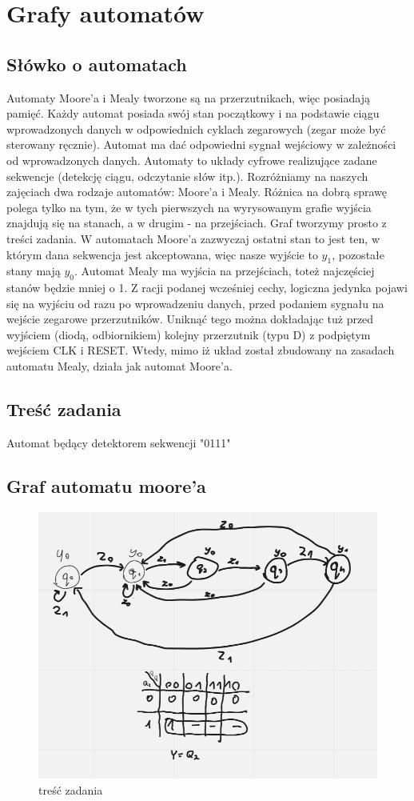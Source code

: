 \section{Grafy automatów}

\subsection{Słówko o automatach}

Automaty Moore'a i Mealy tworzone są na przerzutnikach, więc posiadają pamięć. Każdy automat posiada swój stan początkowy i na podstawie ciągu wprowadzonych danych w odpowiednich cyklach zegarowych (zegar może być sterowany ręcznie). Automat ma dać odpowiedni sygnał wejściowy w zależności od wprowadzonych danych. Automaty to układy cyfrowe realizujące zadane sekwencje (detekcję ciągu, odczytanie słów itp.). Rozróżniamy na naszych zajęciach dwa rodzaje automatów: Moore'a i Mealy. Różnica na dobrą sprawę polega tylko na tym, że w tych pierwszych na wyrysowanym grafie wyjścia znajdują się na stanach, a w drugim - na przejściach. Graf tworzymy prosto z treści zadania. W automatach Moore'a zazwyczaj ostatni stan to jest ten, w którym dana sekwencja jest akceptowana, więc nasze wyjście to $y_1$, pozostałe stany mają $y_0$. Automat Mealy ma wyjścia na przejściach, toteż najczęściej stanów będzie mniej o 1. Z racji podanej wcześniej cechy, logiczna jedynka pojawi się na wyjściu od razu po wprowadzeniu danych, przed podaniem sygnału na wejście zegarowe przerzutników. Uniknąć tego można dokładając tuż przed wyjściem (diodą, odbiornikiem) kolejny przerzutnik (typu D) z podpiętym wejściem CLK i RESET. Wtedy, mimo iż układ został zbudowany na zasadach automatu Mealy, działa jak automat Moore'a.

\subsection{Treść zadania}

Automat będący detektorem sekwencji "0111"

\subsection{Graf automatu moore'a}

\begin{figure}[h!]
    \centering
    \includegraphics[width=.55\textwidth]{images/graph/g_moore.png}
    \caption{treść zadania}
    \label{fig:my_label}
\end{figure}

